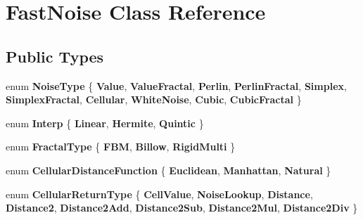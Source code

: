 \hypertarget{classFastNoise}{}\section{Fast\+Noise Class Reference}
\label{classFastNoise}
\subsection*{Public Types}
\begin{DoxyCompactItemize}
\item 
\mbox{\label{classFastNoise_a77adcfdc4d6e9410ef6099553509d09f}} 
enum {\bfseries Noise\+Type} \{ \newline
{\bfseries Value}, 
{\bfseries Value\+Fractal}, 
{\bfseries Perlin}, 
{\bfseries Perlin\+Fractal}, 
\newline
{\bfseries Simplex}, 
{\bfseries Simplex\+Fractal}, 
{\bfseries Cellular}, 
{\bfseries White\+Noise}, 
\newline
{\bfseries Cubic}, 
{\bfseries Cubic\+Fractal}
 \}
\item 
\mbox{\label{classFastNoise_a60969f626ea3ea3504ea51d789f19a33}} 
enum {\bfseries Interp} \{ {\bfseries Linear}, 
{\bfseries Hermite}, 
{\bfseries Quintic}
 \}
\item 
\mbox{\label{classFastNoise_a20a2d45a468fa10a7c6a94e22c2f3d30}} 
enum {\bfseries Fractal\+Type} \{ {\bfseries F\+BM}, 
{\bfseries Billow}, 
{\bfseries Rigid\+Multi}
 \}
\item 
\mbox{\label{classFastNoise_a457e58d0da6dbe486deb5a21a3db52bf}} 
enum {\bfseries Cellular\+Distance\+Function} \{ {\bfseries Euclidean}, 
{\bfseries Manhattan}, 
{\bfseries Natural}
 \}
\item 
\mbox{\label{classFastNoise_a942d73b97b870138c9a07249d5a57737}} 
enum {\bfseries Cellular\+Return\+Type} \{ \newline
{\bfseries Cell\+Value}, 
{\bfseries Noise\+Lookup}, 
{\bfseries Distance}, 
{\bfseries Distance2}, 
\newline
{\bfseries Distance2\+Add}, 
{\bfseries Distance2\+Sub}, 
{\bfseries Distance2\+Mul}, 
{\bfseries Distance2\+Div}
 \}
\end{DoxyCompactItemize}
